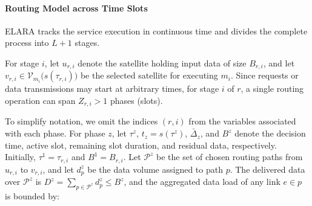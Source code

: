 \documentclass[10pt, conference, letterpaper]{IEEEtran}
\begin{document}

\paragraph{Routing Model across Time Slots}
ELARA tracks the service execution in continuous time and divides the complete process into $L+1$ stages. 

For stage $i$, let $u_{r,i}$ denote the satellite holding input data of size $B_{r,i}$, and let $v_{r,i}\in\mathcal{V}_{m_i}\big(s(\tau_{r,i})\big)$ be the selected satellite for executing $m_i$.
Since requests or data transmissions may start at arbitrary times, for stage $i$ of $r$, a single routing operation can span $Z_{r,i} > 1$ phases (slots).

To simplify notation, we omit the indices $(r,i)$ from the variables associated with each phase.
For phase $z$, let $\tau^z$, $t_z=s(\tau^z)$, $\bar{\Delta}_z$, and $B^z$ denote the decision time, active slot, remaining slot duration, and residual data, respectively. Initially, $\tau^1=\tau_{r,i}$ and $B^1=B_{r,i}$. Let $\mathcal{P}^z$ be the set of chosen routing paths from $u_{r,i}$ to $v_{r,i}$, and let $d_p^z$ be the data volume assigned to path $p$.
The delivered data over $\mathcal{P}^z$ is $ D^z= \sum_{p\in\mathcal{P}^z} d_p^z \leq B^z $, and the aggregated data load of any link $e \in p$ is bounded by:
\end{document}
